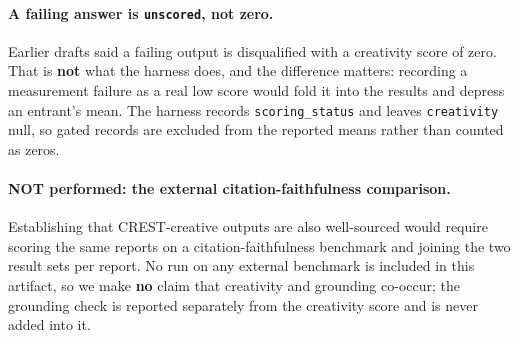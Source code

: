 \paragraph{A failing answer is \texttt{unscored}, not zero.} Earlier drafts said a failing output is
disqualified with a creativity score of zero. That is \textbf{not} what the harness does, and the
difference matters: recording a measurement failure as a real low score would fold it into
the results and depress an entrant's mean. The harness records \texttt{scoring\_status} and leaves
\texttt{creativity} null, so gated records are excluded from the reported means rather than counted
as zeros.

\paragraph{NOT performed: the external citation-faithfulness comparison.} Establishing that
CREST-creative outputs are also well-sourced would require scoring the same reports on a
citation-faithfulness benchmark and joining the two result sets per report. No run on any external
benchmark is included in this artifact, so we make \textbf{no} claim that creativity and grounding
co-occur; the grounding check is reported separately from the creativity score and is never added
into it.
